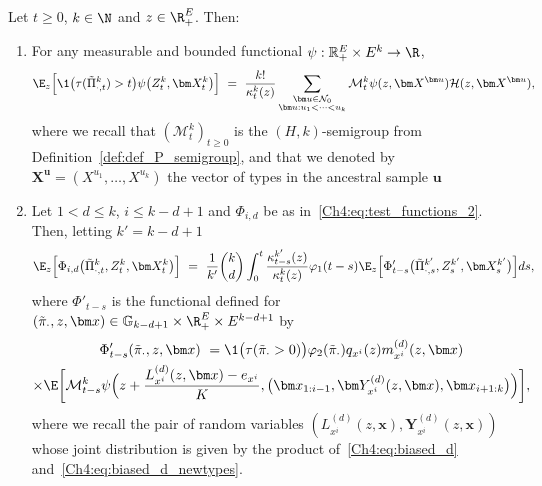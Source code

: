 \begin{refsegment}
\begin{thm}\label{thm:many_to_few}
Let $t\geq0$, $k\in\N$ and $z\in \R_+^E$.  Then:
\begin{enumerate}
\item For any measurable and bounded functional $\psi: \mathbb{R}^E_+\times E^k\to \R$,
\begin{equation}\label{Ch4:eq:many_to_few_basecase}
\E_{z}\Big[\1\big(\tau(\tilde{\Pi}^k_{\cdot,t}) > t\big)\psi\big(Z^k_t, \bm X^k_t\big)\Big]\ =\ \frac{k!}{\kappa^k_{t}(z)} \sum_{\substack{\bm u\in\mathcal{N}_0\\ \bm u:u_1<\cdots<u_k}}\mathcal{M}^k_t{\psi}(z,\bm X^{\bm u}) \mathcal{H}(z,\bm X^{\bm u}),
\end{equation}
where we recall that $(\mathcal{M}^k_t)_{t\geq 0}$ is the $(H,k)$-semigroup from Definition~\ref{def:def_P_semigroup}, and that we denoted by $\bm X^{\bm u}= (X^{u_1},\ldots, X^{u_k})$ the vector of types in the ancestral sample $\bm u$
\item 
Let $1 < d \leq k$, $i \leq k-d+1$ and $\Phi_{i,d}$ 
be as in~\eqref{Ch4:eq:test_functions_2}. Then, letting $k' = k-d+1$  \begin{equation}\label{Ch4:eq:many_to_few_recursion}
  \E_{z}\Big[\Phi_{i,d}\big(\tilde{\Pi}^k_{\cdot,t},  Z^k_t, \bm X^k_t\big)\Big]
  \ =\ \frac{1}{k'}\binom{k}{d} \int_0^t \frac{\kappa^{k'}_{t-s}(z)}{\kappa^k_{t}(z)}\varphi_1(t-s) \E_{z}\Big[\Phi'_{t-s}\big(\tilde{\Pi}^{k'}_{\cdot,s}, Z^{k'}_s, \bm X^{k'}_s\big)\Big] ds,
\end{equation}
where $\Phi'_{t-s}$ is the functional defined for $(\tilde\pi_\cdot, z,\bm x)\in\mathbb{G}_{k-d+1}\times \R_+^E\times  E^{k-d+1}$ by 
\begin{multline}\label{Ch4:eq:functional_pruning}
  \Phi'_{t-s}(\tilde\pi_{\cdot}, z,\bm x)\ = \1\big(\tau(\tilde \pi_\cdot >0)\big)\varphi_2(\tilde{\pi}_\cdot)q_{x^i}(z)m^{(d)}_{x^i}(z,\bm x)\\
  \times \E\bigg[\mathcal{M}^k_{t-s}\psi\Big(z + \frac{L^{(d)}_{x^i}(z, \bm x)-e_{x^i}}{K},\big(\bm x_{1:i-1},\bm Y^{(d)}_{x^i}(z,\bm x), \bm x_{i+1:k}\big)\Big)\bigg],
\end{multline}
 where we recall the pair of random variables $(L^{(d)}_{x^i}(z, \bm x),\bm Y^{(d)}_{x^i}(z,\bm x))$ whose joint distribution is given by the product of~\eqref{Ch4:eq:biased_d} and~\eqref{Ch4:eq:biased_d_newtypes}.
 \end{enumerate}
\end{thm}


\end{refsegment}
